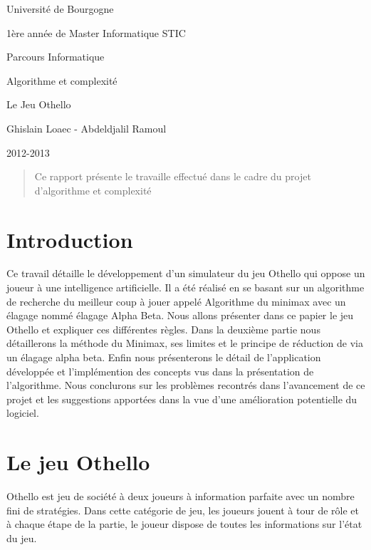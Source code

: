 \documentclass[11pt]{article}
\newenvironment{tmparsep}[1]{\begingroup\setlength{\parskip}{#1}}{\endgroup}
\begin{document}
\begin{center}
  \begin{tmparsep}{0.25em}
    Université de Bourgogne
    
    1ère année de Master Informatique STIC
    
    Parcours Informatique
    
    Algorithme et complexité
  \end{tmparsep}
  
  Le Jeu Othello
  
  Ghislain Loaec - Abdeldjalil Ramoul
  
  2012-2013
\end{center}

\begin{abstract}
  Ce rapport présente le travaille effectué dans le cadre du projet
  d'algorithme et complexité 
\end{abstract}



{\tableofcontents}

{\listoffigures}

{\listoftables}

\section{Introduction}

Ce travail détaille le développement d'un simulateur du jeu Othello
qui oppose un joueur à une intelligence artificielle. Il a été
réalisé en se basant sur un algorithme de recherche du meilleur coup
à jouer appelé Algorithme du minimax avec un élagage nommé
élagage Alpha Beta. Nous allons présenter dans ce papier le jeu
Othello et expliquer ces différentes règles. Dans la deuxième
partie nous détaillerons la méthode du Minimax, ses limites et le
principe de réduction de via un élagage alpha beta. Enfin nous
présenterons le détail de l'application développée et
l'implémention des concepts vus dans la présentation de l'algorithme.
Nous conclurons sur les problèmes recontrés dans l'avancement de ce
projet et les suggestions apportées dans la vue d'une amélioration
potentielle du logiciel.

\section{Le jeu Othello}

Othello est jeu de société à deux joueurs à information
parfaite avec un nombre fini de stratégies. Dans cette catégorie de
jeu, les joueurs jouent à tour de rôle et à chaque étape de la
partie, le joueur dispose de toutes les informations sur l'état du jeu.
\end{document}
